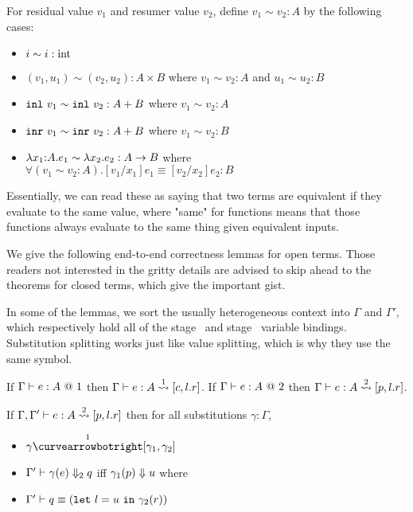 \begin{definition}
For residual value $v_1$ and resumer value $v_2$, define $v_1 \sim v_2 : A$ by the following cases:
\begin{itemize}
\item $i \sim i : \rmint$
\item $(v_1,u_1) \sim (v_2,u_2) : A \times B$ where $v_1 \sim v_2 : A$ and $u_1 \sim u_2 : B$
\item $\inl~v_1 \sim \inl~v_2 : A + B$ where $v_1 \sim v_2 : A$
\item $\inr~v_1 \sim \inr~v_2 : A + B$ where $v_1 \sim v_2 : B$
\item $\lam {x_1} A {e_1} \sim \lambda x_2.e_2 : A \to B$ where \\ $\forall (v_1 \sim v_2 : A). [v_1/x_1]e_1 \equiv [v_2/x_2]e_2 : B$
\end{itemize}
\end{definition}

Essentially, we can read these as saying that two terms are equivalent if they evaluate to the same value,
where "same" for functions means that those functions always evaluate to the same thing given equivalent inputs.

We give the following end-to-end correctness lemmas for open terms. 
Those readers not interested in the gritty details are advised to skip ahead to the theorems for closed terms, which give the important gist.

In some of the lemmas, we sort the usually heterogeneous context into $\Gamma$ and $\Gamma'$, 
which respectively hold all of the stage \bbone\ and stage \bbtwo\ variable bindings.
Substitution splitting works just like value splitting, which is why they use the same symbol.

\begin{lemma}
If $\typesone e A$ then
$\Gamma\vdash e : A \splitonesym [c,l.r]$.
If $\typestwo e A$ then
$\Gamma\vdash e : A \splittwosym [p,l.r]$.
\end{lemma}

\begin{lemma}
If $\Gamma, \Gamma'\vdash e : A \splittwosym [p,l.r]$ then for all substitutions $\gamma : \Gamma$,
\begin{itemize}
\item $\gamma \vsplito [\gamma_1, \gamma_2]$
\item $\diatwo [\Gamma'] {\gamma(e)} q$ iff $\reduce {\gamma_1(p)} u$ where
\item $\Gamma' \vdash q \equiv (\letin{l}{u}{\gamma_2(r)})$
\end{itemize}
\end{lemma}


